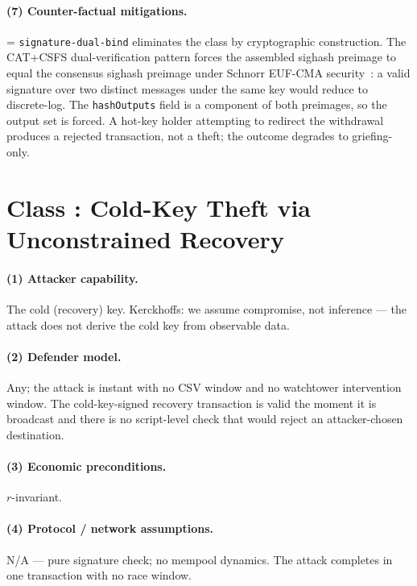 \paragraph{(7) Counter-factual mitigations.}
\axwdbind{} = \texttt{signature-dual-bind} eliminates the class by
cryptographic construction. The CAT+CSFS dual-verification pattern
forces the assembled sighash preimage to equal the consensus sighash
preimage under Schnorr EUF-CMA security~\cite{NRS20}: a valid
signature over two distinct messages under the same key would reduce
to discrete-log. The \texttt{hashOutputs} field is a component of
both preimages, so the output set is forced. A hot-key holder
attempting to redirect the withdrawal produces a rejected
transaction, not a theft; the outcome degrades to griefing-only.

\section{Class \classcold{}: Cold-Key Theft via Unconstrained Recovery}
\label{app:rat:classcold}

\paragraph{(1) Attacker capability.}
The cold (recovery) key. Kerckhoffs: we assume compromise, not
inference --- the attack does not derive the cold key from observable
data.

\paragraph{(2) Defender model.}
Any; the attack is instant with no CSV window and no watchtower
intervention window. The cold-key-signed recovery transaction is
valid the moment it is broadcast and there is no script-level check
that would reject an attacker-chosen destination.

\paragraph{(3) Economic preconditions.}
$r$-invariant.

\paragraph{(4) Protocol / network assumptions.}
N/A --- pure signature check; no mempool dynamics. The attack
completes in one transaction with no race window.


